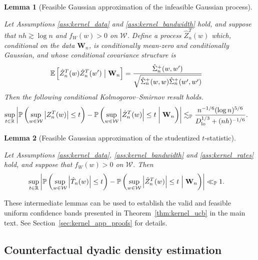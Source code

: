\documentclass[11pt,lof]{puthesis}
\renewcommand{\P}{\ensuremath{\mathbb{P}}}
\newcommand{\R}{\ensuremath{\mathbb{R}}}
\newcommand{\E}{\ensuremath{\mathbb{E}}}
\newcommand{\bW}{\ensuremath{\mathbf{W}}}
\newcommand{\cW}{\ensuremath{\mathcal{W}}}
\newcommand{\Dl}{\ensuremath{D_{\textup{lo}}}}
\theoremstyle{break}
\newtheorem{lemma}{Lemma}[section]
\theoremstyle{proof}
\begin{document}
\begin{lemma}[Feasible Gaussian approximation
of the infeasible Gaussian process]
\label{lem:kernel_app_distributional_approx_feasible_gaussian}

Let Assumptions \ref{ass:kernel_data} and \ref{ass:kernel_bandwidth}
hold, and suppose that
$n h \gtrsim \log n$ and $f_W(w) > 0$ on $\cW$.
Define a process $\hat Z_n^T(w)$ which,
conditional on the data $\bW_n$,
is conditionally mean-zero and
conditionally Gaussian, and whose
conditional covariance structure is
%
\begin{align*}
\E\left[
\hat Z_n^T(w) \hat Z_n^T(w')
\bigm| \bW_n \right]
&=
\frac{\hat \Sigma_n^+(w,w')}
{\sqrt{\hat \Sigma_n^+(w,w) \hat \Sigma_n^+(w',w')}}
\end{align*}
%
Then the following conditional
Kolmogorov--Smirnov result holds.
%
\begin{align*}
\sup_{t \in \R}
\left|
\P\left(
\sup_{w \in \cW}
\left| Z_n^T(w) \right|
\leq t
\right)
- \P\left(
\sup_{w \in \cW}
\left| \hat Z_n^T(w) \right|
\leq t
\biggm\vert \bW_n
\right)
\right|
&\lesssim_\P
\frac{n^{-1/6}(\log n)^{5/6}}
{\Dl^{1/3} + (n h)^{-1/6}}.
\end{align*}

\end{lemma}

\begin{lemma}[Feasible Gaussian approximation of the studentized $t$-statistic]
\label{lem:kernel_app_feasible_gaussian_approx}

Let Assumptions \ref{ass:kernel_data}, \ref{ass:kernel_bandwidth}
and \ref{ass:kernel_rates} hold, and suppose that $f_W(w) > 0$ on $\cW$.
Then
%
\begin{align*}
\sup_{t \in \R}
\left|
\P\left(
\sup_{w \in \cW}
\left| \hat T_n(w) \right|
\leq t
\right)
- \P\left(
\sup_{w \in \cW}
\left| \hat Z_n^T(w) \right|
\leq t
\Bigm\vert \bW_n
\right)
\right|
&\ll_\P
1.
\end{align*}

\end{lemma}

These intermediate lemmas can be used to establish the valid and feasible
uniform confidence bands presented in Theorem~\ref{thm:kernel_ucb} in the main
text. See Section~\ref{sec:kernel_app_proofs} for details.

\subsection{Counterfactual dyadic density estimation}
\end{document}
